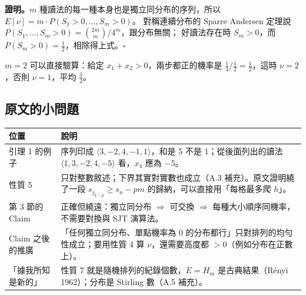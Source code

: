\textbf{證明。}$m$ 種讀法的每一種本身也是獨立同分布的序列，所以 $E[\nu]=m\cdot P(S_1>0,\ldots,S_m>0)$。
對稱連續分布的 Sparre Andersen 定理說 $P(S_1,\ldots,S_m>0)=\binom{2m}{m}/4^m$，跟分布無關；
好讀法存在時 $S_m>0$，而 $P(S_m>0)=\tfrac12$，相除得上式。\hfill$\square$

$m=2$ 可以直接驗算：給定 $x_1+x_2>0$，兩步都正的機率是 $\tfrac14\big/\tfrac12=\tfrac12$，這時 $\nu=2$，否則 $\nu=1$，平均 $\tfrac32$。

\begin{table}[H]
\centering\small
\RanNeySym
\caption{公式與蒙地卡羅（每格 20000 個 $S_m>0$ 的樣本）。均勻與常態給出同樣的數，而且像 $\sqrt m$ 一樣長，比 A.5 的 $H_m\sim\ln m$ 快。}
\label{tab:neysym}
\end{table}

\subsection{原文的小問題}

\begin{center}
\small
\begin{tabular}{@{}p{}p{}@{}}
\toprule
位置 & 說明\\
\midrule
引理 1 的例子 & 序列印成 $\langle3,-2,4,-1,1\rangle$，和是 5 不是 1；從後面列出的讀法 $\langle1,3,-2,4,-5\rangle$ 看，$x_4$ 應為 $-5$。\\
性質 5 & 只對整數敘述；下界其實對實數也成立（A.3 補充）。原文證明繞了一段 $s_{j_{k-p}}\ge s_n-pm$ 的歸納，可以直接用「每格最多爬 $h$」。\\
第 3 節的 Claim & 正確但繞遠：獨立同分布 $\Rightarrow$ 可交換 $\Rightarrow$ 每種大小順序同機率，不需要對換與 SJT 演算法。\\
Claim 之後的推廣 & 「任何獨立同分布、單點機率為 0 的分布都行」只對排列的均勻性成立；要用性質 4 算 $\nu$，還需要高度都 $>0$（例如分布在正數上）。\\
「據我所知是新的」 & 性質 7 就是隨機排列的紀錄個數，$E=H_m$ 是古典結果（Rényi 1962）；分布是 Stirling 數（A.5 補充）。\\
\bottomrule
\end{tabular}
\end{center}
